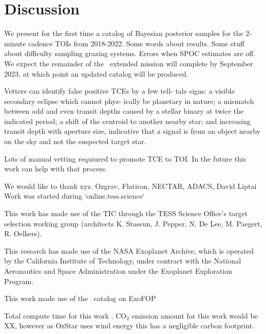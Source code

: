\documentclass[floatfix,ApJL,twocolumn]{aastex631}
\begin{document}
\section{Discussion}\label{sec:conclusion}
We present for the first time a catalog of Bayesian posterior samples for the 2-minute cadence TOIs from 2018-2022.
Some words about results.
Some stuff about difficulty sampling grazing systems.
Errors when SPOC estimates are off.
We expect the remainder of the \tess\ extended mission will complete by September 2023, at which point an updated catalog will be produced.

Vetters can identify false positive TCEs by a few tell- tale signs: a visible secondary eclipse which cannot phys- ically be planetary in nature; a mismatch between odd and even transit depths caused by a stellar binary at twice the indicated period; a shift of the centroid to another nearby star; and increasing transit depth with aperture size, indicative that a signal is from an object nearby on the sky and not the suspected target star.

Lots of manual vetting requiured to promote TCE to TOI. In the future this work can help with that process.


\begin{acknowledgments}

We would like to thank xyz.
Ozgrav, Flatiron, NECTAR, ADACS, David Liptai
Work was started during `online.tess.science`

This work has made use of the TIC through the TESS Science Office’s target selection working group (architects K. Stassun, J. Pepper, N. De Lee, M. Paegert, R. Oelkers).

This research has made use of the NASA Exoplanet Archive, which is operated by the California Institute of Technology, under contract with the National Aeronautics and Space Administration under the Exoplanet Exploration Program.

This work made use of the \tess\ catalog on ExoFOP

Total compute time for this work \red{\cpuHrs} . CO$_2$ emission amount for this work would be XX, however as OzStar uses wind energy this has a negligible carbon footprint.

\end{acknowledgments}

\vspace{5mm}
\end{document}

